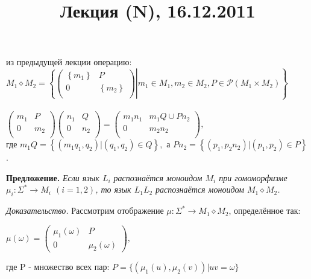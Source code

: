 \documentclass[a4paper,12pt]{article}
\title{Лекция (N), 16.12.2011}
\date{}
\author{}
\begin{document}
\maketitle

 из предыдущей лекции операцию: \\
\begin{math}
M_1 \diamond M_2 = \left.\left\{ \left(\begin{array}{cc}
\left\{m_1\right\} & P \\
0 & \left\{m_2\right\} \\
\end{array}\right) \right| m_1\in M_1, m_2\in M_2, P\in \mathcal{P}\left( M_1 \times  M_2 \right)
\right\}
\end{math}
\\\\
\begin{math}
\left( \begin{array}{cc} m_1 & P \\ 0 & m_2 \\ \end{array} \right)
\left( \begin{array}{cc} n_1 & Q \\ 0 & n_2 \\ \end{array} \right)
=
\left( \begin{array}{cc} m_1n_1 &  m_1Q \cup Pn_2 \\ 0 & m_2n_2 \\ \end{array} \right) , \end{math}\\
где \begin{math}
m_1Q=\left\{ \left( m_1q_1,q_2\right) | \left( q_1, q_2\right) \in Q\right\},\end{math} а \begin{math}
Pn_2=\left\{ \left( p_1,p_2n_2\right) | \left( p_1, p_2\right) \in P\right\}
\end{math}.
\\
\par\textbf{Предложение.} \textit{Если язык $L_i$ распознаётся моноидом $M_i$ при гомоморфизме $\mu_i : \Sigma^*\to M_i$  $(i=1,2)$, то язык $L_1L_2$ распознаётся моноидом $M_1 \diamond M_2$.}\\
\par\textit{Доказательство.} Рассмотрим отображение $\mu \colon \Sigma^*\to M_1 \diamond M_2$, определённое так:
\begin{center}
\begin{math}
\mu(\omega)=\left( \begin{array}{cc} \mu_1(\omega) & P \\ 0 & \mu_2(\omega)\end{array}\right), 
\end{math}\end{center}
где P - множество всех пар: $P=\{ ( \mu_1(u),\mu_2(v))| uv=\omega\}$
\end{document}
